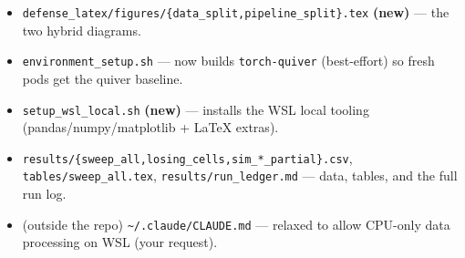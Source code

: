 \begin{itemize}
--- honest step-1 assumptions.
\item \texttt{defense\_latex/figures/\{data\_split,pipeline\_split\}.tex} \textbf{(new)} --- the two hybrid diagrams.
\item \texttt{environment\_setup.sh} --- now builds \texttt{torch-quiver} (best-effort) so fresh
pods get the quiver baseline.
\item \texttt{setup\_wsl\_local.sh} \textbf{(new)} --- installs the WSL local tooling
(pandas/numpy/matplotlib + LaTeX extras).
\item \texttt{results/\{sweep\_all,losing\_cells,sim\_*\_partial\}.csv}, \texttt{tables/sweep\_all.tex},
\texttt{results/run\_ledger.md} --- data, tables, and the full run log.
\item (outside the repo) \texttt{\textasciitilde/.claude/CLAUDE.md} --- relaxed to allow CPU-only
data processing on WSL (your request).
\end{itemize}
